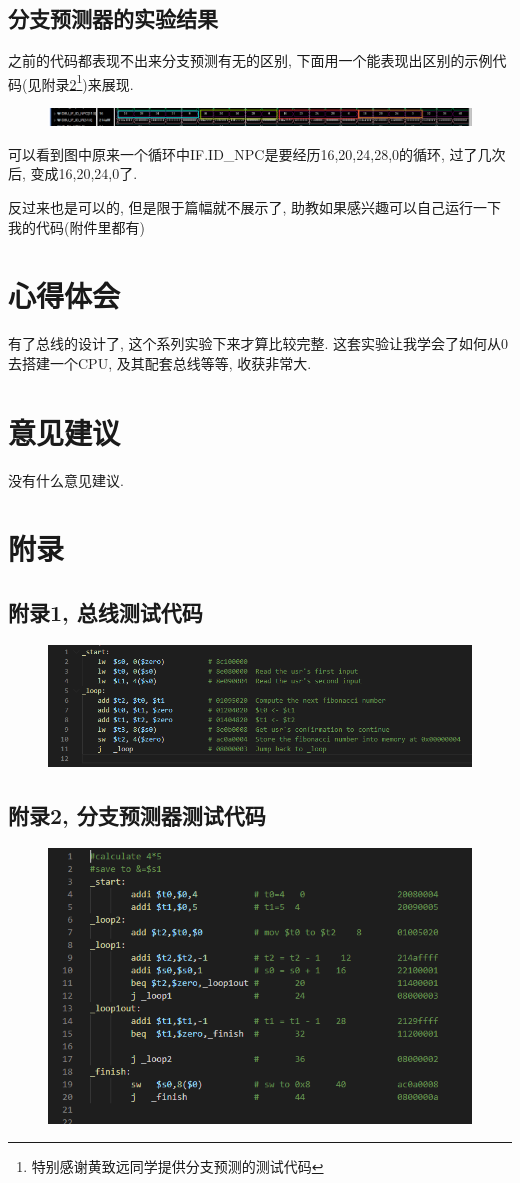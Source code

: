 \documentclass[UTF8]{article}
\begin{document}
\subsection{分支预测器的实验结果}
之前的代码都表现不出来分支预测有无的区别, 下面用一个能表现出区别的示例代码(见附录\ref{asm_predictor}\footnote{特别感谢黄致远同学提供分支预测的测试代码})来展现.\par
\begin{figure}[H]
	\centering
	\includegraphics[width=\linewidth]{predictor.png}
\end{figure}
可以看到图中原来一个循环中IF.ID\_NPC是要经历16,20,24,28,0的循环, 过了几次后, 变成16,20,24,0了.\par
反过来也是可以的, 但是限于篇幅就不展示了, 助教如果感兴趣可以自己运行一下我的代码(附件里都有)


\section{心得体会}
有了总线的设计了, 这个系列实验下来才算比较完整. 这套实验让我学会了如何从0去搭建一个CPU, 及其配套总线等等, 收获非常大.
\section{意见建议}
没有什么意见建议.
\section{附录}
\subsection{附录1, 总线测试代码}
\begin{figure}[H]
	\centering
	\includegraphics[width=\linewidth]{asm.png}
	\label{asm}
\end{figure}
\subsection{附录2, 分支预测器测试代码}
\begin{figure}[H]
	\centering
	\includegraphics[width=\linewidth]{asm_predictor.png}
	\label{asm_predictor}
\end{figure}
\end{document}
